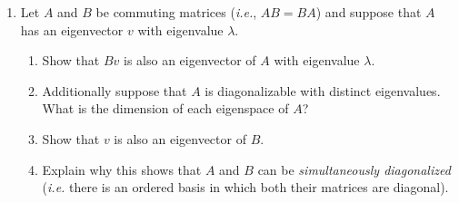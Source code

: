 \begin{enumerate}
\begin{itemize}
{\itshape Note:} It turns out that every matrix is similar to a block matrix whose diagonal blocks look like diagonal matrices or the ones above and whose off-diagonal blocks are all zero. This is called the {\itshape Jordan form} of the matrix and a (maximal) block that looks like
\[
\left(
\begin{array}{ccccc}
\lambda & 1 & 0&\cdots & 0 \\
0 & \lambda & 1 & & 0 \\
\vdots &  &\ddots &\ddots &  \\
&&&\lambda&1\\
0 &0 &&  0 & \lambda
\end{array}\right)
\]
is called a \emph{Jordan $n$-cell} or a \emph{Jordan block} where $n$ is the size of the block.
\end{itemize}


\item Let $A$ and $B$ be commuting matrices ({\itshape i.e.}, $AB = BA$) and suppose that $A$ has an eigenvector $v$ with eigenvalue $\lambda$. 
\begin{enumerate}
\item Show that $Bv$ is also  an eigenvector of $A$ with eigenvalue $\lambda$. 
\item Additionally suppose that $A$ is diagonalizable with distinct eigenvalues. What is the dimension of each eigenspace of $A$?
\item Show that $v$ is also an eigenvector of $B$. 
\item Explain why this shows that $A$ and $B$ can be \emph{simultaneously diagonalized} ({\itshape i.e.}
there is an ordered basis in which  both their matrices are diagonal).
\end{enumerate}






\end{enumerate}

